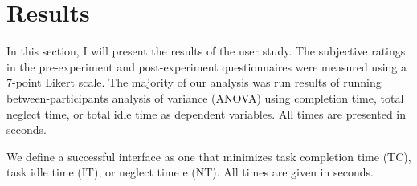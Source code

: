 \section{Results}
\label{sec:study-results}
In this section, I will present the results of the user study. The subjective ratings in the pre-experiment and post-experiment questionnaires were measured using a 7-point Likert scale. The majority of our analysis was run results of running between-participants analysis of variance (ANOVA) using completion time, total neglect time, or total idle time as dependent variables. All times are presented in seconds.


We define a successful interface as one that minimizes task completion time (TC), task idle time (IT), or neglect time e (NT). All times are given in seconds.